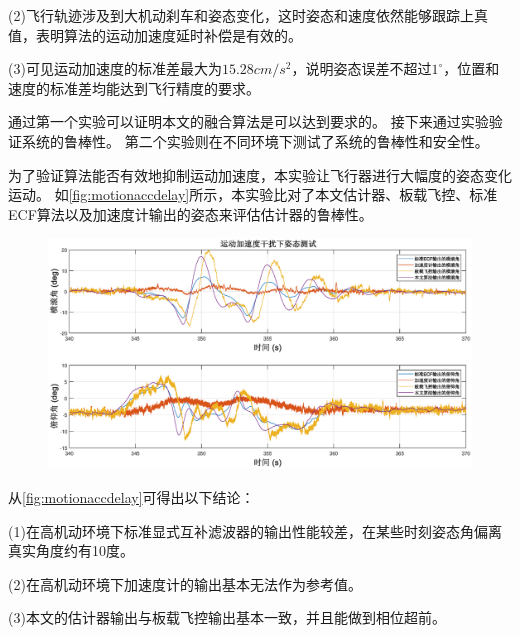 \documentclass[
  type=master
]{gdutthesis}
\begin{document}
(2)飞行轨迹涉及到大机动刹车和姿态变化，这时姿态和速度依然能够跟踪上真值，表明算法的运动加速度延时补偿是有效的。

(3)可见运动加速度的标准差最大为$15.28cm/s^2$，说明姿态误差不超过$1^{\circ}$，位置和速度的标准差均能达到飞行精度的要求。

通过第一个实验可以证明本文的融合算法是可以达到要求的。
接下来通过实验验证系统的鲁棒性。
第二个实验则在不同环境下测试了系统的鲁棒性和安全性。

为了验证算法能否有效地抑制运动加速度，本实验让飞行器进行大幅度的姿态变化运动。
如\autoref{fig:motionaccdelay}所示，本实验比对了本文估计器、板载飞控、标准ECF算法以及加速度计输出的姿态来评估估计器的鲁棒性。
\begin{figure}[H]
	\centering
	\includegraphics[width=1.0\textwidth]{motionaccdelay2.eps}
	\label{fig:motionaccdelay}
\end{figure}

从\autoref{fig:motionaccdelay}可得出以下结论：

(1)在高机动环境下标准显式互补滤波器的输出性能较差，在某些时刻姿态角偏离真实角度约有10度。

(2)在高机动环境下加速度计的输出基本无法作为参考值。

(3)本文的估计器输出与板载飞控输出基本一致，并且能做到相位超前。
\end{document}
